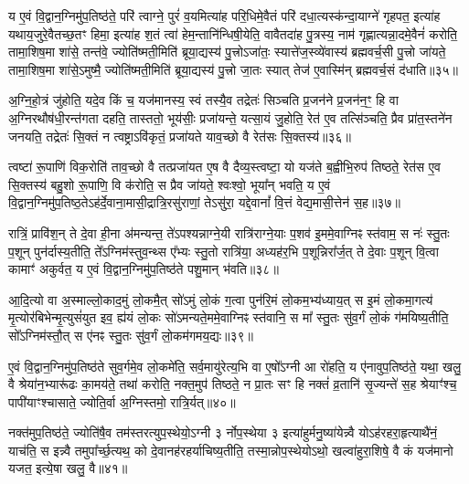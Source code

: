 य ए॒वं वि॒द्वान॒ग्निमु॑प॒तिष्ठ॑ते॒ परि॑ त्वाग्ने॒ पुरं॑ व॒यमित्या॑ह परि॒धिमे॒वैतं परि॑ दधा॒त्यस्क॑न्दा॒याग्ने॑ गृहपत॒ इत्या॑ह यथाय॒जुरे॒वैतच्छ॒तꣳ हिमा॒ इत्या॑ह श॒तं त्वा॑ हेम॒न्तानि॑न्धिषी॒येति॒ वावैतदा॑ह पु॒त्रस्य॒ नाम॑ गृह्णात्यन्ना॒दमे॒वैनं॑ करोति॒ तामा॒शिष॒मा शा॑से॒ तन्त॑वे॒ ज्योति॑ष्मती॒मिति॑ ब्रूया॒द्यस्य॑ पु॒त्त्रो\-ऽजा॑तः॒ स्यात्ते॑ज॒स्व्ये॑वास्य॑ ब्रह्मवर्च॒सी पु॒त्त्रो जा॑यते॒ तामा॒शिष॒मा शा॑से॒\-ऽमुष्मै॒ ज्योति॑ष्मती॒मिति॑ ब्रूया॒द्यस्य॑ पु॒त्त्रो जा॒तः स्यात् तेज॑ ए॒वास्मि॑न् ब्रह्मवर्च॒सं द॑धाति॥३५॥

{}

अ॒ग्नि॒हो॒त्रं जु॑होति॒ यदे॒व किं च॒ यज॑मानस्य॒ स्वं तस्यै॒व तद्रेतः॑ सिञ्चति प्र॒जन॑ने प्र॒जन॑न॒ꣳ॒ हि वा अ॒ग्निरथौष॑धी॒रन्त॑गता दहति॒ तास्ततो॒ भूय॑सीः॒ प्रजा॑यन्ते॒ यत्सा॒यं जु॒होति॒ रेत॑ ए॒व तत्सि॑ञ्चति॒ प्रैव प्रा॑त॒स्तने॑न जनयति॒ तद्रेतः॑ सि॒क्तं न त्वष्ट्रा\-ऽवि॑कृतं॒ प्रजा॑यते याव॒च्छो वै रेत॑सः सि॒क्तस्य॑॥३६॥

त्वष्टा॑ रू॒पाणि॑ विक॒रोति॑ ताव॒च्छो वै तत्प्रजा॑यत ए॒ष वै दैव्य॒स्त्वष्टा॒ यो यज॑ते ब॒ह्वीभि॒रुप॑ तिष्ठते॒ रेत॑स ए॒व सि॒क्तस्य॑ बहु॒शो रू॒पाणि॒ वि क॑रोति॒ स प्रैव जा॑यते॒ श्वःश्वो॒ भूया᳚न् भवति॒ य ए॒वं वि॒द्वान॒ग्निमु॑प॒तिष्ठ॒ते\-ऽह॑र्दे॒वाना॒मासी॒द्रात्रि॒रसु॑राणां॒ ते\-ऽसु॑रा॒ यद्दे॒वानां᳚ वि॒त्तं वेद्य॒मासी॒त्तेन॑ स॒ह॥३७॥

रात्रिं॒ प्रावि॑श॒न् ते दे॒वा ही॒ना अ॑मन्यन्त॒ ते॑\-ऽपश्यन्नाग्ने॒यी रात्रि॑राग्ने॒याः प॒शव॑ इ॒ममे॒वाग्निꣴ स्त॑वाम॒ स नः॑ स्तु॒तः प॒शून् पुन॑र्दास्य॒तीति॒ ते᳚\-ऽग्निम॑स्तुव॒न्थ्स ए᳚भ्यः स्तु॒तो रात्रि॑या॒ अध्यह॑र॒भि प॒शून्निरा᳚र्ज॒त् ते दे॒वाः प॒शून् वि॒त्वा कामाꣳ॑ अकुर्वत॒ य ए॒वं वि॒द्वान॒ग्निमु॑प॒तिष्ठ॑ते पशु॒मान् भ॑वति॥३८॥

आ॒दि॒त्यो वा अ॒स्माल्लो॒काद॒मुं लो॒कमै॒त् सो॑\-ऽमुं लो॒कं ग॒त्वा पुन॑रि॒मं लो॒कम॒भ्य॑ध्याय॒त् स इ॒मं लो॒कमा॒गत्य॑ मृ॒त्योर॑बिभेन्मृ॒त्युसं॑युत इव॒ ह्य॑यं लो॒कः सो॑\-ऽमन्यते॒ममे॒वाग्निꣴ स्त॑वानि॒ स मा᳚ स्तु॒तः सु॑व॒र्गं लो॒कं ग॑मयिष्य॒तीति॒ सो᳚\-ऽग्निम॑स्तौ॒त् स ए॑नꣴ स्तु॒तः सु॑व॒र्गं लो॒कम॑गमय॒द्यः॥३९॥

ए॒वं वि॒द्वान॒ग्निमु॑प॒तिष्ठ॑ते सुव॒र्गमे॒व लो॒कमे॑ति॒ सर्व॒मायु॑रेत्य॒भि वा ए॒षो᳚\-ऽग्नी आ रो॑हति॒ य ए॑नावुप॒तिष्ठ॑ते॒ यथा॒ खलु॒ वै श्रेया॑न॒भ्यारू॑ढः का॒मय॑ते॒ तथा॑ करोति॒ नक्त॒मुप॑ तिष्ठते॒ न प्रा॒तः सꣳ हि नक्तं॑ व्र॒तानि॑ सृ॒ज्यन्ते॑ स॒ह श्रेयाꣳ॑श्च॒ पापी॑याꣳश्चासाते॒ ज्योति॒र्वा अ॒ग्निस्तमो॒ रात्रि॒र्यत्॥४०॥

नक्त॑मुप॒तिष्ठ॑ते॒ ज्योति॑षै॒व तम॑स्तरत्युप॒स्थेयो॒\-ऽग्नी ३ र्नोप॒स्थेया ३ इत्या॑हुर्मनु॒ष्या॑येन्न्वै यो\-ऽह॑रहरा॒हृत्याथै॑नं॒ याच॑ति॒ स इन्न्वै तमुपा᳚र्च्छ॒त्यथ॒ को दे॒वानह॑रहर्याचिष्य॒तीति॒ तस्मा॒न्नोप॒स्थेयो\-ऽथो॒ खल्वा॑हुरा॒शिषे॒ वै कं यज॑मानो यजत॒ इत्ये॒षा खलु॒ वै॥४१॥

